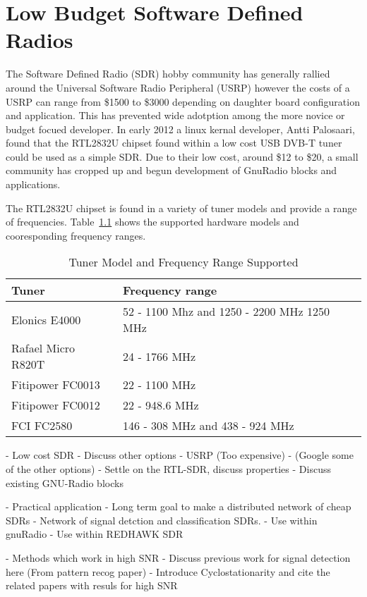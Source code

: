 \chapter{Low Budget Software Defined Radios}

The Software Defined Radio (SDR) hobby community has generally rallied around
the Universal Software Radio Peripheral (USRP) however the costs of a USRP can
range from \$1500 to \$3000 depending on daughter board configuration and
application.  This has prevented wide adotption among the more novice or budget
focued developer. In early 2012 a linux kernal developer, Antti Palosaari, found
that the RTL2832U chipset found within a low cost USB DVB-T tuner
could be used as a simple SDR.  Due to their low cost, around \$12 to \$20, a
small community has cropped up and begun development of GnuRadio blocks and
applications.

The RTL2832U chipset is found in a variety of tuner models and provide a range of frequencies.
Table~\ref{tab:ModelAndFreq} shows the supported hardware models and cooresponding frequency ranges.

\begin{table}
\caption{Tuner Model and Frequency Range Supported}
\begin{tabular}{| l | l |} \hline
Tuner	& Frequency range \\ \hline
Elonics E4000	& 52 - 1100 Mhz and 1250 - 2200 MHz 1250 MHz \\ \hline
Rafael Micro R820T &	24 - 1766 MHz \\ \hline
Fitipower FC0013 & 22 - 1100 MHz  \\ \hline
Fitipower FC0012 &	22 - 948.6 MHz \\ \hline
FCI FC2580	& 146 - 308 MHz and 438 - 924 MHz \\ \hline
\end{tabular}
\label{tab:ModelAndFreq}
\end{table}


 - Low cost SDR
 	- Discuss other options
 	- USRP (Too expensive)
 	- (Google some of the other options)
 	- Settle on the RTL-SDR, discuss properties
 	- Discuss existing GNU-Radio blocks
 
 - Practical application
	- Long term goal to make a distributed network of cheap SDRs
	- Network of signal detction and classification SDRs.
	- Use within gnuRadio
	- Use within REDHAWK SDR
   
 - Methods which work in high SNR
 	- Discuss previous work for signal detection here (From pattern recog paper)
 	- Introduce Cyclostationarity and cite the related papers with resuls for high
 	SNR
 
